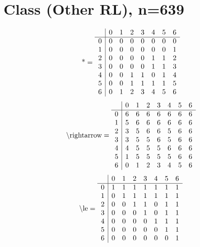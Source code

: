 \documentclass[11pt]{article}
\begin{document}
\section{Class (Other RL), n=639}
\[\text{*} = 
\begin{array}{r | r r r r r r r}
 & 0 & 1 & 2 & 3 & 4 & 5 & 6 \\ \hline
0 & 0 & 0 & 0 & 0 & 0 & 0 & 0 \\
1 & 0 & 0 & 0 & 0 & 0 & 0 & 1 \\
2 & 0 & 0 & 0 & 0 & 1 & 1 & 2 \\
3 & 0 & 0 & 0 & 0 & 1 & 1 & 3 \\
4 & 0 & 0 & 1 & 1 & 0 & 1 & 4 \\
5 & 0 & 0 & 1 & 1 & 1 & 1 & 5 \\
6 & 0 & 1 & 2 & 3 & 4 & 5 & 6 \\
\end{array}
\]
\[\text{\textbackslash rightarrow} = 
\begin{array}{r | r r r r r r r}
 & 0 & 1 & 2 & 3 & 4 & 5 & 6 \\ \hline
0 & 6 & 6 & 6 & 6 & 6 & 6 & 6 \\
1 & 5 & 6 & 6 & 6 & 6 & 6 & 6 \\
2 & 3 & 5 & 6 & 6 & 5 & 6 & 6 \\
3 & 3 & 5 & 5 & 6 & 5 & 6 & 6 \\
4 & 4 & 5 & 5 & 5 & 6 & 6 & 6 \\
5 & 1 & 5 & 5 & 5 & 5 & 6 & 6 \\
6 & 0 & 1 & 2 & 3 & 4 & 5 & 6 \\
\end{array}
\]
\[\text{\textbackslash le} = 
\begin{array}{r | r r r r r r r}
 & 0 & 1 & 2 & 3 & 4 & 5 & 6 \\ \hline
0 & 1 & 1 & 1 & 1 & 1 & 1 & 1 \\
1 & 0 & 1 & 1 & 1 & 1 & 1 & 1 \\
2 & 0 & 0 & 1 & 1 & 0 & 1 & 1 \\
3 & 0 & 0 & 0 & 1 & 0 & 1 & 1 \\
4 & 0 & 0 & 0 & 0 & 1 & 1 & 1 \\
5 & 0 & 0 & 0 & 0 & 0 & 1 & 1 \\
6 & 0 & 0 & 0 & 0 & 0 & 0 & 1 \\
\end{array}
\]
\end{document}
